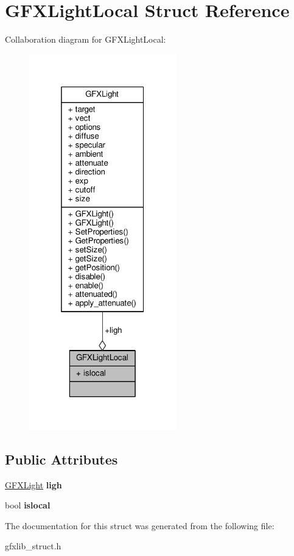 \hypertarget{structGFXLightLocal}{}\section{G\+F\+X\+Light\+Local Struct Reference}
\label{structGFXLightLocal}


Collaboration diagram for G\+F\+X\+Light\+Local\+:
\nopagebreak
\begin{figure}[H]
\begin{center}
\leavevmode
\includegraphics[width=181pt]{db/d5c/structGFXLightLocal__coll__graph}
\end{center}
\end{figure}
\subsection*{Public Attributes}
\begin{DoxyCompactItemize}
\item 
\hyperlink{classGFXLight}{G\+F\+X\+Light} {\bfseries ligh}\hypertarget{structGFXLightLocal_a816cb46bd423430c3d2945b9f98f6f99}{}\label{structGFXLightLocal_a816cb46bd423430c3d2945b9f98f6f99}

\item 
bool {\bfseries islocal}\hypertarget{structGFXLightLocal_a964f41aba6f93b27157ff4f0f5f4b4ff}{}\label{structGFXLightLocal_a964f41aba6f93b27157ff4f0f5f4b4ff}

\end{DoxyCompactItemize}


The documentation for this struct was generated from the following file\+:\begin{DoxyCompactItemize}
\item 
gfxlib\+\_\+struct.\+h\end{DoxyCompactItemize}
